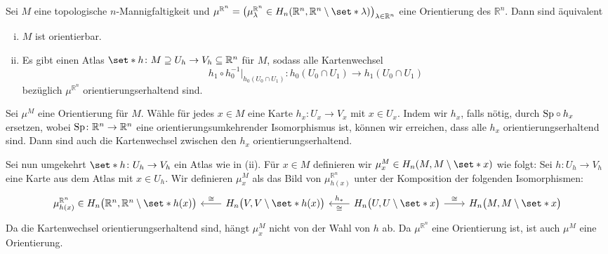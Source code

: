 \begin{satz}[{name=[{Äquivalenz von Orientierbarkeit und Existenz eines Orientierungsatlanten}]},label=satz:orientierbar_atlas]
	Sei $M$ eine topologische $n$-Mannigfaltigkeit und $\mu^{\mathbb{R}^n} = \enbrace*{\mu_\lambda^{\mathbb{R}^n} \in H_n(\mathbb{R}^n, \mathbb{R}^n \setminus \set*{\lambda})}_{\lambda \in \mathbb{R}^n}$ eine Orientierung des $\mathbb{R}^n$.
	Dann sind äquivalent
	\begin{enumerate}[(i)]
		\item $M$ ist orientierbar.
		\item Es gibt einen Atlas $\set*{h \colon M\supseteq U_h \to V_h \subseteq \mathbb{R}^n}$ für $M$, sodass alle Kartenwechsel 
		\[
			h_1 \circ h_0^{-1} \big|_{h_0(U_0 \cap U_1)} \colon h_0 (U_0 \cap U_1) \longrightarrow h_1(U_0 \cap U_1)
		\]
		bezüglich $\mu^{\mathbb{R}^n}$ orientierungserhaltend sind.
	\end{enumerate}
\end{satz}
\begin{beweis}
	Sei $\mu^M$ eine Orientierung für $M$.
	Wähle für jedes $x \in M$ eine Karte $h_x \colon U_x \to V_x$ mit $x \in U_x$.
	Indem wir $h_x$, falls nötig, durch ${\operatorname{Sp}} \circ h_x$ ersetzen, wobei $\operatorname{Sp} \colon \mathbb{R}^n \to \mathbb{R}^n$ eine orientierungsumkehrender Isomorphismus ist, können wir erreichen, dass alle $h_x$ orientierungserhaltend sind.
	Dann sind auch die Kartenwechsel zwischen den $h_x$ orientierungserhaltend.
	
	Sei nun umgekehrt $\set*{h \colon U_h \to V_h}$ ein Atlas wie in (ii).
	Für $x \in M$ definieren wir $\mu_x^M \in H_n(M,M \setminus \set*{x})$ wie folgt: 
	Sei $h  \colon U_h \to V_h$ eine Karte aus dem Atlas mit $x \in U_h$.
	Wir definieren $\mu_x^M$ als das Bild von $\mu_{h(x)}^{\mathbb{R}^n}$ unter der Komposition der folgenden Isomorphismen:
	\[
		\begin{tikzcd}[sep=2.1em]
			\mu^{\mathbb{R}^n}_{h(x)} \in H_n \enbrace[\big]{\mathbb{R}^n,\mathbb{R}^n \setminus \set*{h(x)}} & H_n \enbrace[\big]{V,V\setminus \set*{h(x)}} \lar["\cong"'] &
			H_n \enbrace[\big]{U,U \setminus \set*{x}} \lar["\cong","h_*"'] \rar["\cong"] & H_n \enbrace[\big]{M,M \setminus \set*{x}}
		\end{tikzcd}
	\]
	Da die Kartenwechsel orientierungserhaltend sind, hängt $\mu_x^M$ nicht von der Wahl von $h$ ab.
	Da $\mu^{\mathbb{R}^n}$ eine Orientierung ist, ist auch $\mu^M$ eine Orientierung.
\end{beweis}

